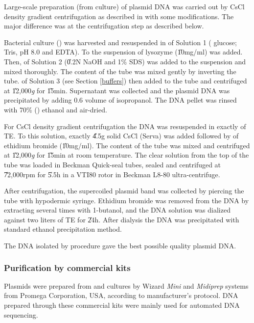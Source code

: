 Large-scale preparation (from  culture) of plasmid DNA was
carried out by CsCl density gradient centrifugation as described
in \citet{Sambrook1989} with some modifications. The major
difference was at the centrifugation step as described below.

Bacterial culture () was harvested and resuspended in
 of Solution 1 ( glucose;  Tris, pH 8.0 and
 EDTA). To the suspension  of lysozyme
(\U{10}{mg/ml}) was added. Then,  of Solution 2 (\U{0.2}{N}
NaOH and 1\% SDS) was added to the suspension and mixed
thoroughly. The content of the tube was mixed gently by inverting
the tube.  of Solution 3 (see Section \ref{buffers}) then
added to the tube and centrifuged at \U{12,000}{\emph g} for
\U{15}{min}. Supernatant was collected and the plasmid DNA was
precipitated by adding 0.6 volume of isopropanol. The DNA pellet
was rinsed with 70\% () ethanol and air-dried.

For CsCl density gradient centrifugation the DNA was resuspended
in exactly  of TE. To this solution, exactly \U{4.5}{g}
solid CsCl (Serva) was added followed by  of ethidium
bromide (\U{10}{mg/ml}). The content of the tube was mixed and
centrifuged at \U{12,000}{\textit{g}} for \U{15}{min} at room
temperature. The clear solution from the top of the tube was
loaded in Beckman Quick-seal tubes, sealed and centrifuged at
\U{72,000}{rpm} for \U{5.5}{h} in a VTI80 rotor in Beckman L8-80
ultra-centrifuge.

After centrifugation, the supercoiled plasmid band was collected
by piercing the tube with hypodermic syringe. Ethidium bromide was
removed from the DNA by extracting several times with 1-butanol,
and the DNA solution was dialized against two liters of TE for
\U{24}{h}. After dialysis the DNA was precipitated with standard
ethanol precipitation method.

The DNA isolated by procedure gave the best possible quality
plasmid DNA.


\subsubsection{Purification by commercial kits}

Plasmids were prepared from  and  cultures by
Wizard{\scriptsize\texttrademark} \textit{Mini} and
\textit{Midi\-prep} systems from Promega Corporation, USA,
according to manufacturer's protocol. DNA prepared through these
commercial kits were mainly used for automated DNA sequencing.

